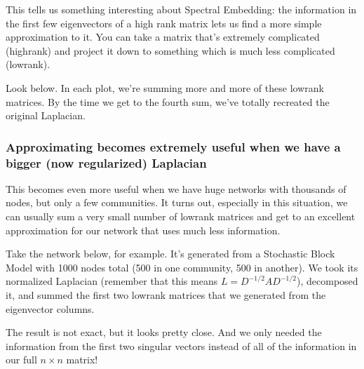\documentclass[letterpaper,10pt,english]{jupyterBook}
\begin{document}
\sphinxAtStartPar
This tells us something interesting about Spectral Embedding: the information in the first few eigenvectors of a high rank matrix lets us find a more simple approximation to it. You can take a matrix that’s extremely complicated (high\sphinxhyphen{}rank) and project it down to something which is much less complicated (low\sphinxhyphen{}rank).

\sphinxAtStartPar
Look below. In each plot, we’re summing more and more of these low\sphinxhyphen{}rank matrices. By the time we get to the fourth sum, we’ve totally recreated the original Laplacian.

\noindent{}


\subsubsection{Approximating becomes extremely useful when we have a bigger (now regularized) Laplacian}
\label{\detokenize{representations/ch6/spectral-embedding:approximating-becomes-extremely-useful-when-we-have-a-bigger-now-regularized-laplacian}}
\sphinxAtStartPar
This becomes even more useful when we have huge networks with thousands of nodes, but only a few communities. It turns out, especially in this situation, we can usually sum a very small number of low\sphinxhyphen{}rank matrices and get to an excellent approximation for our network that uses much less information.

\sphinxAtStartPar
Take the network below, for example. It’s generated from a Stochastic Block Model with 1000 nodes total (500 in one community, 500 in another). We took its normalized Laplacian (remember that this means \(L = D^{-1/2} A D^{-1/2}\)), decomposed it, and summed the first two low\sphinxhyphen{}rank matrices that we generated from the eigenvector columns.

\sphinxAtStartPar
The result is not exact, but it looks pretty close. And we only needed the information from the first two singular vectors instead of all of the information in our full \(n \times n\) matrix!
\end{document}
